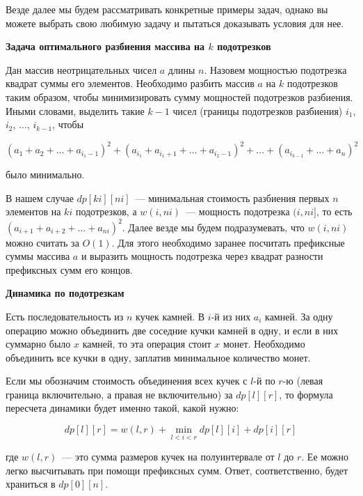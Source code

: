 Везде далее мы будем рассматривать конкретные примеры задач, однако вы можете выбрать свою любимую задачу и пытаться доказывать условия для нее.

\begin{example} \textbf{Задача оптимального разбиения массива на $k$ подотрезков}

    Дан массив неотрицательных чисел $a$ длины $n$. Назовем мощностью подотрезка квадрат суммы его элементов. Необходимо разбить массив $a$ на $k$ подотрезков таким образом, чтобы минимизировать сумму мощностей подотрезков разбиения. Иными словами, выделить такие $k - 1$ чисел (границы подотрезков разбиения) $i_1$, $i_2$, $\ldots$, $i_{k - 1}$, чтобы

    $$(a_1 + a_2 + \ldots + a_{i_1 - 1})^2 + (a_{i_1} + a_{i_1 + 1} + \ldots + a_{i_2 - 1})^2 + \ldots + (a_{i_{k - 1}} + \ldots + a_{n})^2$$

было минимально.

В нашем случае $dp[ki][ni]$~--- минимальная стоимость разбиения первых $n$ элементов на $ki$ подотрезков, а $w(i, ni)$~--- мощность подотрезка $(i, ni]$, то есть $(a_{i + 1} + a_{i + 2} + \ldots + a_{ni})^2$. Далее везде мы будем подразумевать, что $w(i, ni)$ можно считать за $O(1)$. Для этого необходимо заранее посчитать префиксные суммы массива $a$ и выразить мощность подотрезка через квадрат разности префиксных сумм его концов.
\end{example}

\begin{example} \textbf{Динамика по подотрезкам}

    Есть последовательность из $n$ кучек камней. В $i$-й из них $a_i$ камней. За одну операцию можно объединить две соседние кучки камней в одну, и если в них суммарно было $x$ камней, то эта операция стоит $x$ монет. Необходимо объединить все кучки в одну, заплатив минимальное количество монет.

Если мы обозначим стоимость объединения всех кучек с $l$-й по $r$-ю (левая граница включительно, а правая не включительно) за $dp[l][r]$, то формула пересчета динамики будет именно такой, какой нужно:

$$dp[l][r] = w(l, r) + \min_{l < i < r} dp[l][i] + dp[i][r]$$

где $w(l, r)$~--- это сумма размеров кучек на полуинтервале от $l$ до $r$. Ее можно легко высчитывать при помощи префиксных сумм. Ответ, соответственно, будет храниться в $dp[0][n]$.
\end{example}

